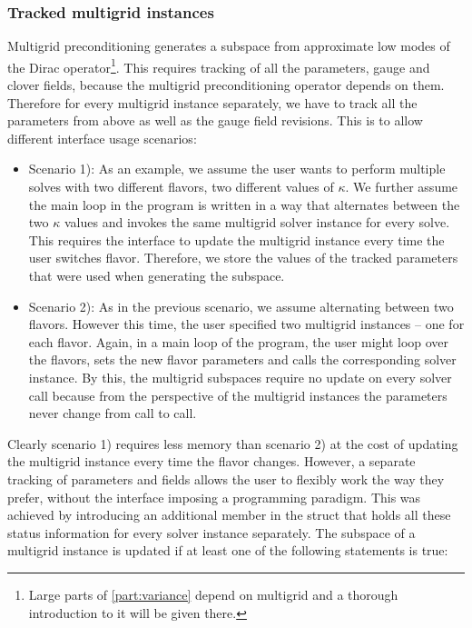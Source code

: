 \subsubsection{Tracked multigrid instances}

Multigrid preconditioning generates a subspace from approximate low modes of the Dirac operator\footnote{Large parts of \cref{part:variance} depend on multigrid and a thorough introduction to it will be given there.}.
This requires tracking of all the parameters, gauge and clover fields, because the multigrid preconditioning operator depends on them.
Therefore for every multigrid instance separately, we have to track all the parameters from above as well as the gauge field revisions.
This is to allow different interface usage scenarios:
\begin{itemize}
  \item Scenario 1): As an example, we assume the user wants to perform multiple solves with two different flavors, \ie two different values of $\kappa$. We further assume the main loop in the program is written in a way that alternates between the two $\kappa$ values and invokes the same multigrid solver instance for every solve. This requires the interface to update the multigrid instance every time the user switches flavor. Therefore, we store the values of the tracked parameters that were used when generating the subspace.
  \item Scenario 2): As in the previous scenario, we assume alternating between two flavors. However this time, the user specified two multigrid instances -- one for each flavor. Again, in a main loop of the program, the user might loop over the flavors, sets the new flavor parameters and calls the corresponding solver instance. By this, the multigrid subspaces require no update on every solver call because from the perspective of the multigrid instances the parameters never change from call to call.
\end{itemize}
Clearly scenario 1) requires less memory than scenario 2) at the cost of updating the multigrid instance every time the flavor changes.
However, a separate tracking of parameters and fields allows the user to flexibly work the way they prefer, without the interface imposing a programming paradigm.
This was achieved by introducing an additional member in the  struct that holds all these status information for every solver instance separately.
The subspace of a multigrid instance is updated if at least one of the following statements is true:
